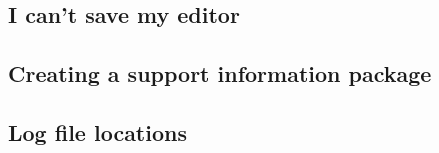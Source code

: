 \subsection{I can't save my editor}
\label{troublelocked}


\subsection{Creating a support information package}


\subsection{Log file locations}

